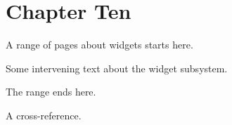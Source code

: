 \chapter{Chapter Ten}

A range of pages about widgets starts here.

Some intervening text about the widget subsystem.

The range ends here.

A cross-reference.



